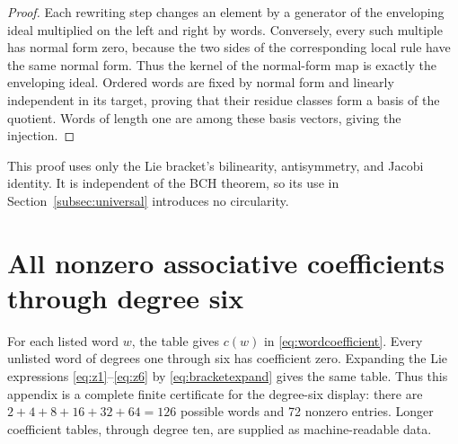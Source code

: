 \documentclass[11pt]{article}
\theoremstyle{definition}
\theoremstyle{remark}
\numberwithin{equation}{section}
\begin{document}
\begin{proof}
Each rewriting step changes an element by a generator of the enveloping ideal multiplied on the left and right by words. Conversely, every such multiple has normal form zero, because the two sides of the corresponding local rule have the same normal form. Thus the kernel of the normal-form map is exactly the enveloping ideal. Ordered words are fixed by normal form and linearly independent in its target, proving that their residue classes form a basis of the quotient. Words of length one are among these basis vectors, giving the injection.
\end{proof}
This proof uses only the Lie bracket's bilinearity, antisymmetry, and Jacobi identity. It is independent of the BCH theorem, so its use in Section~\ref{subsec:universal} introduces no circularity.

\section{All nonzero associative coefficients through degree six}\label{app:wordtable}
For each listed word $w$, the table gives $c(w)$ in \eqref{eq:wordcoefficient}. Every unlisted word of degrees one through six has coefficient zero. Expanding the Lie expressions \eqref{eq:z1}--\eqref{eq:z6} by \eqref{eq:bracketexpand} gives the same table. Thus this appendix is a complete finite certificate for the degree-six display: there are $2+4+8+16+32+64=126$ possible words and 72 nonzero entries. Longer coefficient tables, through degree ten, are supplied as machine-readable data.
\end{document}
